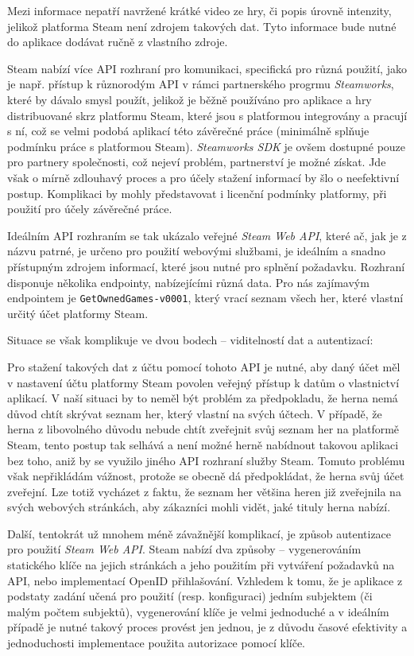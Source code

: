 Mezi informace nepatří navržené krátké video ze hry, či popis úrovně
intenzity, jelikož platforma Steam není zdrojem takových dat. Tyto
informace bude nutné do aplikace dodávat ručně z vlastního zdroje.

Steam nabízí více API rozhraní pro komunikaci, specifická pro různá
použití, jako je např. přístup k různorodým API v rámci partnerského
progrmu \emph{Steamworks}, které by dávalo smysl použít, jelikož je
běžně používáno pro aplikace a hry distribuované skrz platformu Steam,
které jsou s platformou integrovány a pracují s ní, což se velmi podobá
aplikací této závěrečné práce (minimálně splňuje podmínku práce s
platformou Steam). \emph{Steamworks SDK} je ovšem dostupné pouze pro
partnery společnosti, což nejeví problém, partnerství je možné získat.
Jde však o mírně zdlouhavý proces a pro účely stažení informací by šlo o
neefektivní postup. Komplikaci by mohly představovat i licenční podmínky
platformy, při použití pro účely závěrečné práce.

Ideálním API rozhraním se tak ukázalo veřejné \emph{Steam Web API},
které ač, jak je z názvu patrné, je určeno pro použití webovými
službami, je ideálním a snadno přístupným zdrojem informací, které jsou
nutné pro splnění požadavku. Rozhraní disponuje několika endpointy,
nabízejícími různá data. Pro nás zajímavým endpointem je
\texttt{GetOwnedGames-v0001}, který vrací seznam všech her, které
vlastní určitý účet platformy Steam.

Situace se však komplikuje ve dvou bodech -- viditelností dat a
autentizací:

Pro stažení takových dat z účtu pomocí tohoto API je nutné, aby daný
účet měl v nastavení účtu platformy Steam povolen veřejný přístup k
datům o vlastnictví aplikací. V naší situaci by to neměl být problém za
předpokladu, že herna nemá důvod chtít skrývat seznam her, který vlastní
na svých účtech. V případě, že herna z libovolného důvodu nebude chtít
zveřejnit svůj seznam her na platformě Steam, tento postup tak selhává a
není možné herně nabídnout takovou aplikaci bez toho, aniž by se využilo
jiného API rozhraní služby Steam. Tomuto problému však nepřikládám
vážnost, protože se obecně dá předpokládat, že herna svůj účet zveřejní.
Lze totiž vycházet z faktu, že seznam her většina heren již zveřejnila
na svých webových stránkách, aby zákazníci mohli vidět, jaké tituly
herna nabízí.

Další, tentokrát už mnohem méně závažnější komplikací, je způsob
autentizace pro použití \emph{Steam Web API}. Steam nabízí dva způsoby
-- vygenerováním statického klíče na jejich stránkách a jeho použitím
při vytváření požadavků na API, nebo implementací OpenID přihlašování.
Vzhledem k tomu, že je aplikace z podstaty zadání učená pro použití
(resp. konfiguraci) jedním subjektem (či malým počtem subjektů),
vygenerování klíče je velmi jednoduché a v ideálním případě je nutné
takový proces provést jen jednou, je z důvodu časové efektivity a
jednoduchosti implementace použita autorizace pomocí klíče.

